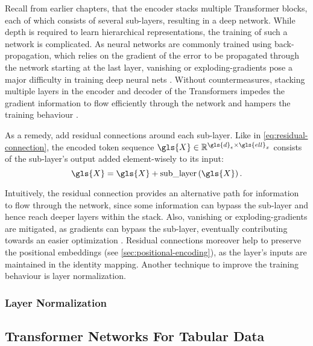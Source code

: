 Recall from earlier chapters, that the encoder stacks multiple Transformer blocks, each of which consists of several sub-layers, resulting in a deep network.  While depth is required to learn hierarchical representations, the training of such a network is complicated. As neural networks are commonly trained using back-propagation, which relies on the gradient of the error to be propagated through the network starting at the last layer, vanishing or \glspl{exploding-gradient} pose a major difficulty in training deep neural nets \autocite[][1]{heDeepResidualLearning2015}. Without countermeasures, stacking multiple layers in the encoder and decoder of the Transformers impedes the gradient information to flow efficiently through the network and hampers the training behaviour \autocite[][1811]{wangLearningDeepTransformer2019}.

As a remedy, \textcite[][3]{vaswaniAttentionAllYou2017} add residual connections \autocite[][1--2]{heDeepResidualLearning2015} around each sub-layer. Like in \cref{eq:residual-connection}, the encoded token sequence $\gls{X} \in \mathbb{R}^{\gls{d}_e \times \gls{ell}_x}$ consists of the sub-layer's output added element-wisely to its input:
\begin{equation}
  \gls{X} = \gls{X} + \operatorname{sub\_layer}\left(\gls{X}\right).
  \label{eq:residual-connection}
\end{equation}

Intuitively, the residual connection provides an alternative path for information to flow through the network, since some information can bypass the sub-layer and hence reach deeper layers within the stack. Also, vanishing or \glspl{exploding-gradient} are mitigated, as gradients can bypass the sub-layer, eventually contributing towards an easier optimization \autocite[][3591]{liuRethinkingSkipConnection2020}.  Residual connections moreover help to preserve the positional embeddings (see \cref{sec:positional-encoding}), as the layer's inputs are maintained in the identity mapping. Another technique to improve the training behaviour is layer normalization.

\subsubsection{Layer Normalization}\label{sec:layer-norm}

\subsection{Transformer Networks For Tabular Data}\label{sec:tabular-transformer}

